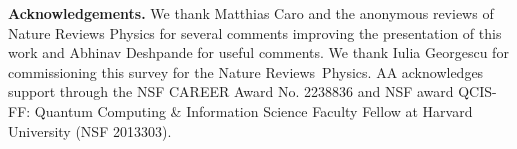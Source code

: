 \documentclass[11pt]{article}
\begin{document}
\textbf{Acknowledgements.} We thank Matthias Caro and  the anonymous reviews of Nature Reviews Physics for several comments improving the presentation of this work and Abhinav Deshpande for useful comments. We thank Iulia Georgescu for commissioning this survey for the Nature Reviews~Physics. AA acknowledges support through the NSF CAREER Award No. 2238836 and NSF award QCIS-FF: Quantum Computing \& Information Science Faculty Fellow at Harvard University (NSF 2013303).

\newcommand{\etalchar}[1]{$^{#1}$}
\end{document}

